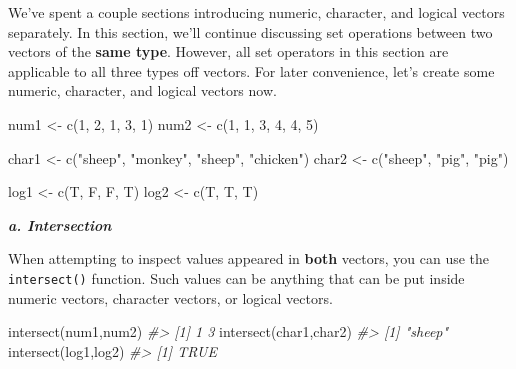 \documentclass[
]{book}
\newenvironment{Shaded}{\begin{snugshade}}{\end{snugshade}}
\newcommand{\CommentTok}[1]{\textcolor[rgb]{0.56,0.35,0.01}{\textit{#1}}}
\newcommand{\DecValTok}[1]{\textcolor[rgb]{0.00,0.00,0.81}{#1}}
\newcommand{\FunctionTok}[1]{\textcolor[rgb]{0.00,0.00,0.00}{#1}}
\newcommand{\NormalTok}[1]{#1}
\newcommand{\OtherTok}[1]{\textcolor[rgb]{0.56,0.35,0.01}{#1}}
\newcommand{\StringTok}[1]{\textcolor[rgb]{0.31,0.60,0.02}{#1}}
\begin{document}
We've spent a couple sections introducing numeric, character, and logical vectors separately. In this section, we'll continue discussing set operations between two vectors of the \textbf{same type}. However, all set operators in this section are applicable to all three types off vectors. For later convenience, let's create some numeric, character, and logical vectors now.

\begin{Shaded}
\begin{Highlighting}[]
\NormalTok{num1 }\OtherTok{\textless{}{-}} \FunctionTok{c}\NormalTok{(}\DecValTok{1}\NormalTok{, }\DecValTok{2}\NormalTok{, }\DecValTok{1}\NormalTok{, }\DecValTok{3}\NormalTok{, }\DecValTok{1}\NormalTok{)}
\NormalTok{num2 }\OtherTok{\textless{}{-}} \FunctionTok{c}\NormalTok{(}\DecValTok{1}\NormalTok{, }\DecValTok{1}\NormalTok{, }\DecValTok{3}\NormalTok{, }\DecValTok{4}\NormalTok{, }\DecValTok{4}\NormalTok{, }\DecValTok{5}\NormalTok{)}

\NormalTok{char1 }\OtherTok{\textless{}{-}} \FunctionTok{c}\NormalTok{(}\StringTok{"sheep"}\NormalTok{, }\StringTok{"monkey"}\NormalTok{, }\StringTok{"sheep"}\NormalTok{, }\StringTok{"chicken"}\NormalTok{)}
\NormalTok{char2 }\OtherTok{\textless{}{-}} \FunctionTok{c}\NormalTok{(}\StringTok{"sheep"}\NormalTok{, }\StringTok{"pig"}\NormalTok{, }\StringTok{"pig"}\NormalTok{)}

\NormalTok{log1 }\OtherTok{\textless{}{-}} \FunctionTok{c}\NormalTok{(T, F, F, T)}
\NormalTok{log2 }\OtherTok{\textless{}{-}} \FunctionTok{c}\NormalTok{(T, T, T)}
\end{Highlighting}
\end{Shaded}

\textbf{\emph{a. Intersection}}

When attempting to inspect values appeared in \textbf{both} vectors, you can use the \texttt{intersect()} function. Such values can be anything that can be put inside numeric vectors, character vectors, or logical vectors.

\begin{Shaded}
\begin{Highlighting}[]
\FunctionTok{intersect}\NormalTok{(num1,num2)}
\CommentTok{\#\textgreater{} [1] 1 3}
\FunctionTok{intersect}\NormalTok{(char1,char2)}
\CommentTok{\#\textgreater{} [1] "sheep"}
\FunctionTok{intersect}\NormalTok{(log1,log2)}
\CommentTok{\#\textgreater{} [1] TRUE}
\end{Highlighting}
\end{Shaded}
\end{document}
